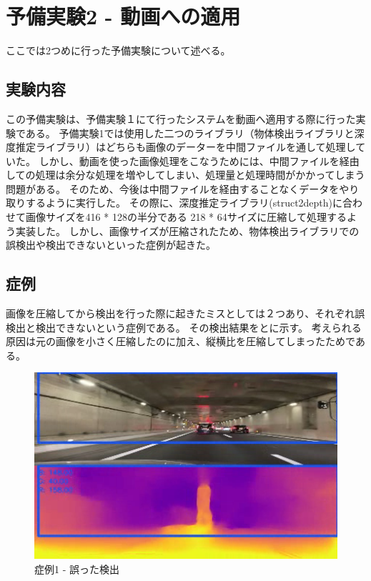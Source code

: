 \newpage
\section{予備実験2 - 動画への適用}
ここでは2つめに行った予備実験について述べる。
\subsection{実験内容}
この予備実験は、予備実験１にて行ったシステムを動画へ適用する際に行った実験である。
予備実験1では使用した二つのライブラリ（物体検出ライブラリと深度推定ライブラリ）はどちらも画像のデーターを中間ファイルを通して処理していた。
しかし、動画を使った画像処理をこなうためには、中間ファイルを経由しての処理は余分な処理を増やしてしまい、処理量と処理時間がかかってしまう問題がある。
そのため、今後は中間ファイルを経由することなくデータをやり取りするように実行した。
その際に、深度推定ライブラリ(struct2depth)に合わせて画像サイズを416 * 128の半分である 218 * 64サイズに圧縮して処理するよう実装した。
しかし、画像サイズが圧縮されたため、物体検出ライブラリでの誤検出や検出できないといった症例が起きた。

\subsection{症例}
画像を圧縮してから検出を行った際に起きたミスとしては２つあり、それぞれ誤検出と検出できないという症例である。
その検出結果をとに示す。
考えられる原因は元の画像を小さく圧縮したのに加え、縦横比を圧縮してしまったためである。


\newpage
\begin{figure}[htbp]
  \begin{center}
   \includegraphics[width=12cm]{figs/miss_1.png}
  \end{center}
  \caption{症例1 - 誤った検出}
  \label{fig:miss1}
\end{figure}

